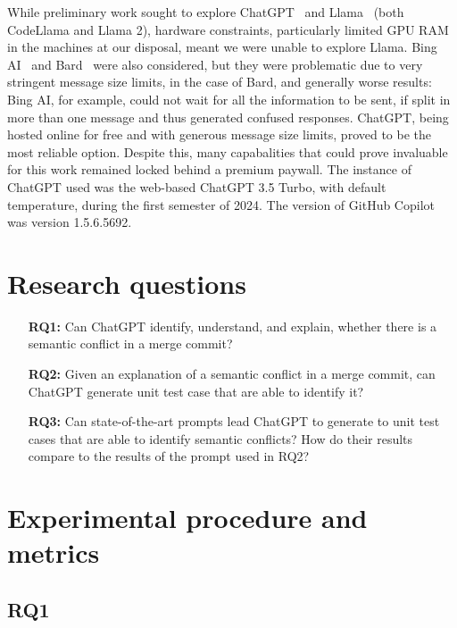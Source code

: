 While preliminary work sought to explore ChatGPT~\cite{kn:gpt} and Llama~\cite{kn:llama} (both CodeLlama and Llama 2), hardware constraints, particularly limited GPU RAM in the machines at our disposal, meant we were unable to explore Llama.  Bing AI~\cite{kn:bingAI} and Bard~\cite{kn:bard} were also considered, but they were problematic due to very stringent message size limits, in the case of Bard, and generally worse results: Bing AI, for example, could not wait for all the information to be sent, if split in more than one message and thus generated confused responses. ChatGPT, being hosted online for free and with generous message size limits, proved to be the most reliable option. Despite this, many capabalities that could prove invaluable for this work remained locked behind a premium paywall.
The instance of ChatGPT used was the web-based ChatGPT 3.5 Turbo, with default temperature, during the first semester of 2024.
The version of GitHub Copilot was version 1.5.6.5692.

\section{Research questions}

\begin{itemize}
  \item[\textbf{RQ1:}] Can ChatGPT identify, understand, and explain, whether
  there is a semantic conflict in a merge commit?

  \item[\textbf{RQ2:}] Given an explanation of a semantic conflict in a merge
  commit, can ChatGPT generate unit test case that are able to identify it?

  \item[\textbf{RQ3:}] Can state-of-the-art prompts lead ChatGPT to generate to
  unit test cases that are able to identify semantic conflicts?  How do their
  results compare to the results of the prompt used in RQ2?
\end{itemize}

\section{Experimental procedure and metrics}

\subsection{RQ1}

